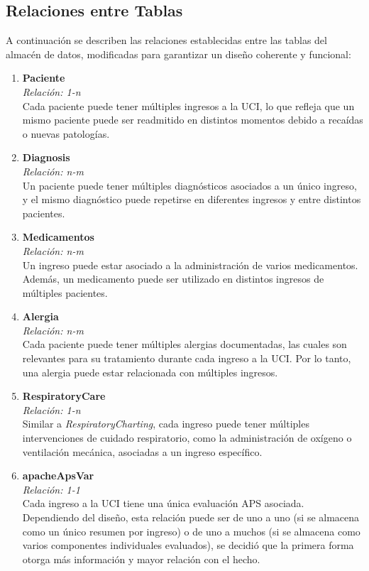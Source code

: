 \documentclass[12pt, a4paper, twoside]{article}
\begin{document}
	
	\subsection{Relaciones entre Tablas}
	A continuación se describen las relaciones establecidas entre las tablas del almacén de datos, modificadas para garantizar un diseño coherente y funcional:
	
	\begin{enumerate}
		\item \textbf{Paciente} \\
		\textit{Relación: 1-n} \\
		Cada paciente puede tener múltiples ingresos a la UCI, lo que refleja que un mismo paciente puede ser readmitido en distintos momentos debido a recaídas o nuevas patologías.
		
		\item \textbf{Diagnosis} \\
		\textit{Relación: n-m} \\
		Un paciente puede tener múltiples diagnósticos asociados a un único ingreso, y el mismo diagnóstico puede repetirse en diferentes ingresos y entre distintos pacientes.
		
		\item \textbf{Medicamentos} \\
		\textit{Relación: n-m} \\
		Un ingreso puede estar asociado a la administración de varios medicamentos. Además, un medicamento puede ser utilizado en distintos ingresos de múltiples pacientes.
		
		\item \textbf{Alergia} \\
		\textit{Relación: n-m} \\
		Cada paciente puede tener múltiples alergias documentadas, las cuales son relevantes para su tratamiento durante cada ingreso a la UCI. Por lo tanto, una alergia puede estar relacionada con múltiples ingresos.
		
		\item \textbf{RespiratoryCare} \\
		\textit{Relación: 1-n} \\
		Similar a \textit{RespiratoryCharting}, cada ingreso puede tener múltiples intervenciones de cuidado respiratorio, como la administración de oxígeno o ventilación mecánica, asociadas a un ingreso específico.
		
		\item \textbf{apacheApsVar} \\
		\textit{Relación: 1-1} \\
		Cada ingreso a la UCI tiene una única evaluación APS asociada. Dependiendo del diseño, esta relación puede ser de uno a uno (si se almacena como un único resumen por ingreso) o de uno a muchos (si se almacena como varios componentes individuales evaluados), se decidió que la primera forma otorga más información y mayor relación con el hecho.
		

\end{enumerate}
\end{document}
